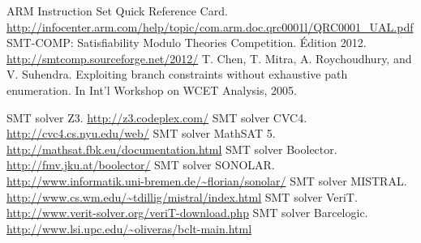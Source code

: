 \documentclass[french]{article}
\begin{document}
\newpage{}
%
\begin{thebibliography}{1}
     ARM Instruction Set Quick Reference Card. \url{http://infocenter.arm.com/help/topic/com.arm.doc.qrc0001l/QRC0001_UAL.pdf}
     SMT-COMP: Satisfiability Modulo Theories Competition. Édition 2012. \url{http://smtcomp.sourceforge.net/2012/}
     T. Chen, T. Mitra, A. Roychoudhury, and V. Suhendra. Exploiting branch constraints without exhaustive path enumeration. In Int’l Workshop on WCET Analysis, 2005.

     SMT solver Z3. \url{http://z3.codeplex.com/}
     SMT solver CVC4. \url{http://cvc4.cs.nyu.edu/web/}
     SMT solver MathSAT 5. \url{http://mathsat.fbk.eu/documentation.html}
     SMT solver Boolector. \url{http://fmv.jku.at/boolector/}
     SMT solver SONOLAR. \url{http://www.informatik.uni-bremen.de/~florian/sonolar/}
     SMT solver MISTRAL. \url{http://www.cs.wm.edu/~tdillig/mistral/index.html}
     SMT solver VeriT. \url{http://www.verit-solver.org/veriT-download.php}
     SMT solver Barcelogic. \url{http://www.lsi.upc.edu/~oliveras/bclt-main.html}
\end{thebibliography}
\end{document}
